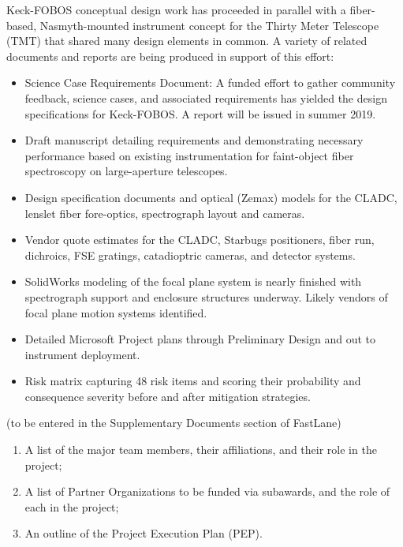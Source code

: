 \documentclass[oneside,11pt]{amsart}
\begin{document}
Keck-FOBOS conceptual design work has proceeded in parallel with a fiber-based, Nasmyth-mounted instrument concept for the Thirty Meter Telescope (TMT) that shared many design elements in common.  A variety of related documents and reports are being produced in support of this effort:

\begin{itemize}
	\item Science Case Requirements Document: A funded effort to gather community feedback, science cases, and associated requirements has yielded the design specifications for Keck-FOBOS.  A report will be issued in summer 2019.

	\item Draft manuscript detailing requirements and demonstrating necessary performance based on existing instrumentation for faint-object fiber spectroscopy on large-aperture telescopes.

	\item Design specification documents and optical (Zemax) models for the CLADC, lenslet fiber fore-optics, spectrograph layout and cameras.

	\item Vendor quote estimates for the CLADC, Starbugs positioners, fiber run, dichroics, FSE gratings, catadioptric cameras, and detector systems.

	\item SolidWorks modeling of the focal plane system is nearly finished with spectrograph support and enclosure structures underway.  Likely vendors of focal plane motion systems identified.

	\item Detailed Microsoft Project plans through Preliminary Design and out to instrument deployment.  

	\item Risk matrix capturing 48 risk items and scoring their probability and consequence severity before and after mitigation strategies.

\end{itemize}

\newpage
{}

(to be entered in the Supplementary Documents section of FastLane)

\begin{enumerate}
%
\item A list of the major team members, their affiliations, and their
role in the project;
%
\item A list of Partner Organizations to be funded via subawards, and
the role of each in the project;
%
\item An outline of the Project Execution Plan (PEP).
\end{enumerate}
\end{document}
